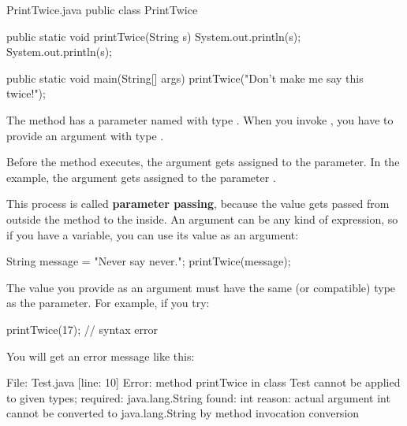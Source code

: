
\begin{trinket}[295]{PrintTwice.java}
public class PrintTwice {

    public static void printTwice(String s) {
        System.out.println(s);
        System.out.println(s);
    }

    public static void main(String[] args) {
        printTwice("Don't make me say this twice!");
    }
}
\end{trinket}

The  method has a parameter named  with type .
When you invoke , you have to provide an argument with type .


Before the method executes, the argument gets assigned to the parameter.
In the  example, the argument  gets assigned to the parameter .


This process is called {\bf parameter passing}, because the value gets passed from outside the method to the inside.
An argument can be any kind of expression, so if you have a  variable, you can use its value as an argument:

\begin{code}
String message = "Never say never.";
printTwice(message);
\end{code}

The value you provide as an argument must have the same (or compatible) type as the parameter.
For example, if you try:

\begin{code}
printTwice(17);  // syntax error
\end{code}

You will get an error message like this:

\begin{stdout}
File: Test.java  [line: 10]
Error: method printTwice in class Test cannot be applied
       to given types;
  required: java.lang.String
  found: int
  reason: actual argument int cannot be converted to
          java.lang.String by method invocation conversion
\end{stdout}

